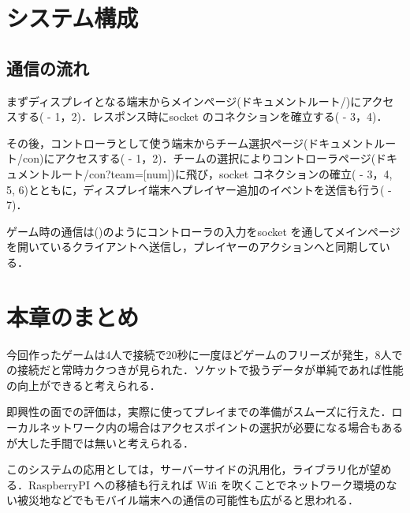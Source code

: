 
\newpage
\section{システム構成}
\subsection{通信の流れ}
まずディスプレイとなる端末からメインページ(ドキュメントルート/)にアクセスする( - 1，2)．レスポンス時にsocket のコネクションを確立する( - 3，4)．

その後，コントローラとして使う端末からチーム選択ページ(ドキュメントルート/con)にアクセスする( - 1，2)．チームの選択によりコントローラページ(ドキュメントルート/con?team=[num])に飛び，socket コネクションの確立( - 3，4, 5, 6)とともに，ディスプレイ端末へプレイヤー追加のイベントを送信も行う( - 7)．

ゲーム時の通信は()のようにコントローラの入力をsocket を通してメインページを開いているクライアントへ送信し，プレイヤーのアクションへと同期している．



\newpage

\section{本章のまとめ}
今回作ったゲームは4人で接続で20秒に一度ほどゲームのフリーズが発生，8人での接続だと常時カクつきが見られた．ソケットで扱うデータが単純であれば性能の向上ができると考えられる．

即興性の面での評価は，実際に使ってプレイまでの準備がスムーズに行えた．ローカルネットワーク内の場合はアクセスポイントの選択が必要になる場合もあるが大した手間では無いと考えられる．


このシステムの応用としては，サーバーサイドの汎用化，ライブラリ化が望める．RaspberryPI への移植も行えれば Wifi を吹くことでネットワーク環境のない被災地などでもモバイル端末への通信の可能性も広がると思われる．

\newpage
